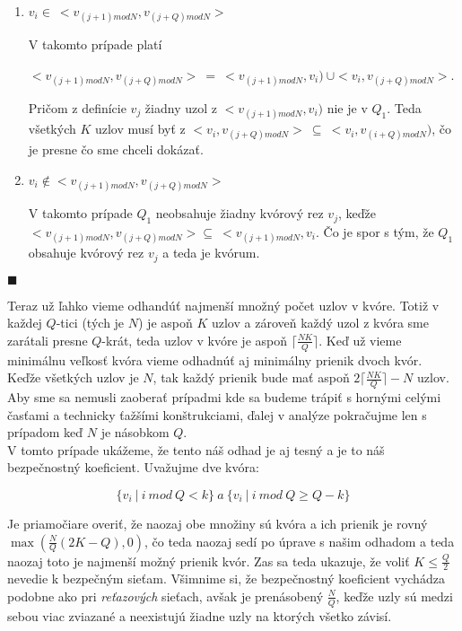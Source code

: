 \begin{enumerate}
  \item $v_i\in\: <v_{(j+1) mod N}, v_{(j+Q) mod N}>$

        V takomto prípade platí

        $<v_{(j+1) mod N}, v_{(j+Q) mod N}>\:=\: <v_{(j+1) mod N}, v_i)\: \cup <v_i, v_{(j+Q) mod N}>$.

        Pričom z definície $v_j$ žiadny uzol z $<v_{(j+1) mod N}, v_i)$ nie je v $Q_1$.
        Teda všetkých $K$ uzlov musí byť z $<v_i, v_{(j+Q) mod N}>\: \subseteq\: <v_i, v_{(i+Q) mod N})$,
        čo je presne čo sme chceli dokázať.
  \item $v_i\notin <v_{(j+1) mod N}, v_{(j+Q) mod N}>$

        V takomto prípade $Q_1$ neobsahuje žiadny kvórový rez $v_j$, keďže\\
        $<v_{(j+1) mod N}, v_{(j+Q) mod N}> \subseteq\: <v_{(j+1) mod N}, v_i$.
        Čo je spor s tým, že $Q_1$ obsahuje kvórový rez $v_j$ a teda je kvórum.
\end{enumerate} $\blacksquare$

\pagebreak

Teraz už ľahko vieme odhandúť najmenší množný počet uzlov v kvóre.
Totiž v každej $Q$-tici (tých je $N$) je aspoň $K$ uzlov a zároveň každý uzol
z kvóra sme zarátali presne $Q$-krát, teda uzlov v kvóre je aspoň
$\lceil\frac{NK}{Q}\rceil$.
Keď už vieme minimálnu veľkosť kvóra vieme odhadnúť aj minimálny prienik dvoch kvór.
Keďže všetkých uzlov je $N$, tak každý prienik bude mať aspoň
$2\lceil\frac{NK}{Q}\rceil-N$ uzlov.
Aby sme sa nemusli zaoberať prípadmi kde sa budeme trápiť s hornými celými časťami
a technicky ťažšími konštrukciami, ďalej v analýze pokračujme len s prípadom keď
$N$ je násobkom $Q$.\\
V tomto prípade ukážeme, že tento náš odhad je aj tesný a je to náš bezpečnostný
koeficient.
Uvažujme dve kvóra:

$$\{v_i\ |\ i\ mod\ Q < k\}\ a \ \{v_i\ |\ i\ mod\ Q \geq Q-k\}$$

Je priamočiare overiť, že naozaj obe množiny sú kvóra a ich prienik je rovný\\
$\max(\frac{N}{Q}(2K-Q),0)$, čo teda naozaj sedí po úprave s našim odhadom
a teda naozaj toto je najmenší možný prienik kvór.
Zas sa teda ukazuje, že voliť $K\leq\frac{Q}{2}$ nevedie k bezpečným sieťam.
Všimnime si, že bezpečnostný koeficient vychádza podobne ako pri
\textit{reťazových} sieťach, avšak je prenásobený $\frac{N}{Q}$, keďže uzly
sú medzi sebou viac zviazané a neexistujú žiadne  uzly na ktorých
všetko závisí.

